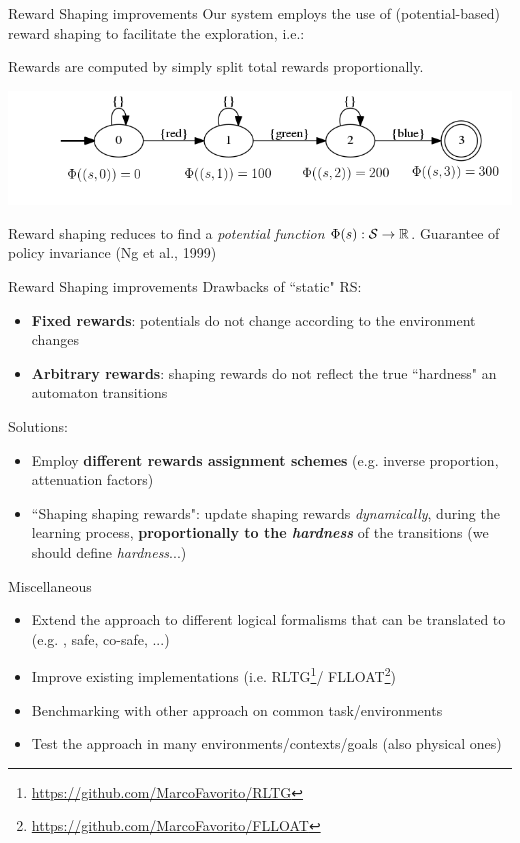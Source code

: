 \documentclass{beamer}
\begin{document}
\begin{frame}{Reward Shaping improvements}
	Our system employs the use of (potential-based) reward shaping to facilitate the exploration, i.e.:
	
	Rewards are computed by simply split total rewards proportionally.
	
	\begin{center}
		\includegraphics[width=\textwidth]{images/sapientino-simple-dfa-horizontal-with-potentials}
	\end{center}
	
	Reward shaping reduces to find a \emph{potential function} $\Phi(s):\S \to \mathbb{R}$. Guarantee of policy invariance (Ng et al., 1999)
\end{frame}

\begin{frame}{Reward Shaping improvements}
	Drawbacks of ``static" RS:
	\begin{itemize}
		\item \textbf{Fixed rewards}: potentials do not change according to the environment changes
		\item \textbf{Arbitrary rewards}: shaping rewards do not reflect the true ``hardness" an automaton transitions
	\end{itemize}
	
	Solutions:
	\begin{itemize}
		\item Employ \textbf{different rewards assignment schemes} (e.g. inverse proportion, attenuation factors)
		\item ``Shaping shaping rewards": update shaping rewards \emph{dynamically}, during the learning process, \textbf{proportionally to the \emph{hardness}} of the transitions (we should define \emph{hardness}...)
	\end{itemize}
\end{frame}
	
\begin{frame}{Miscellaneous}
	\begin{itemize}
		\item Extend the approach to different logical formalisms that can be translated to \DFA (e.g. \PLTL, \LTL safe, \LTL co-safe, ...)
		\item Improve existing implementations (i.e. RLTG\footnote{\url{https://github.com/MarcoFavorito/RLTG}}/ FLLOAT\footnote{\url{https://github.com/MarcoFavorito/FLLOAT}})
		\item Benchmarking with other approach on common task/environments
		\item Test the approach in many environments/contexts/goals (also physical ones)
	\end{itemize}

\end{frame}
\end{document}
